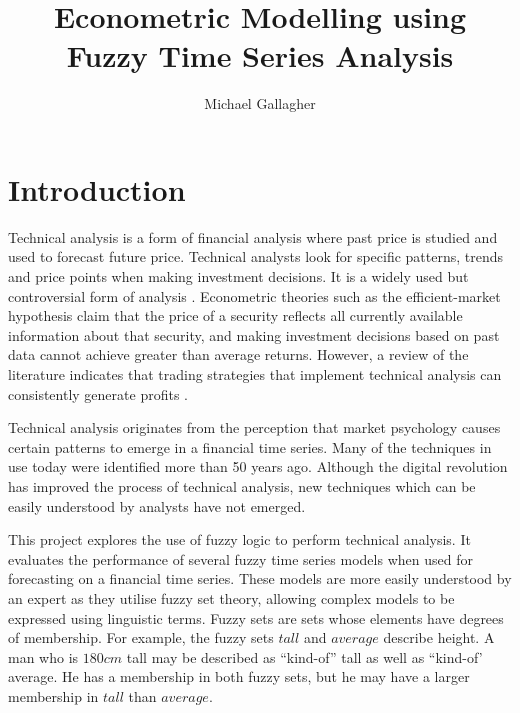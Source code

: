 \documentclass[12pt, oneside, a4paper]{article}
\title{Econometric Modelling using \\Fuzzy Time Series Analysis}
\author{Michael Gallagher}
\theoremstyle{definition}
\begin{document}
\maketitle

\listoffigures

\listoftables

\tableofcontents

\newpage

\section{Introduction}

Technical analysis is a form of financial analysis where past price is studied and used to forecast future price. Technical analysts look for specific patterns, trends and price points when making investment decisions. It is a widely used but controversial form of analysis \citep{foundations}. Econometric theories such as the efficient-market hypothesis claim that the price of a security reflects all currently available information about that security, and making investment decisions based on past data cannot achieve greater than average returns. However, a review of the literature indicates that trading strategies that implement technical analysis can consistently generate profits \citep{taprofitability}.

Technical analysis originates from the perception that market psychology causes certain patterns to emerge in a financial time series. Many of the techniques in use today were identified more than 50 years ago. Although the digital revolution has improved the process of technical analysis, new techniques which can be easily understood by analysts have not emerged.

This project explores the use of fuzzy logic to perform technical analysis. It evaluates the performance of several fuzzy time series models when used for forecasting on a financial time series. These models are more easily understood by an expert as they utilise fuzzy set theory, allowing complex models to be expressed using linguistic terms. Fuzzy sets are sets whose elements have degrees of membership. For example, the fuzzy sets $tall$ and $average$ describe height. A man who is $180cm$ tall may be described as ``kind-of'' tall as well as ``kind-of' average. He has a membership in both fuzzy sets, but he may have a larger membership in $tall$ than $average$.
\end{document}
